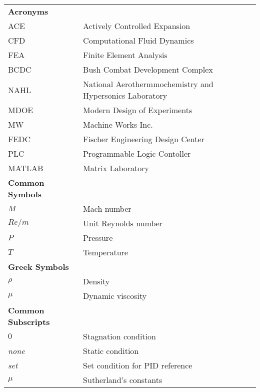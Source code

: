 \begin{spacing}{1.0}
    \begin{longtable}[htbp]{@{}p{} p{}@{}}
       
        \textbf{Acronyms}\\ [2ex] 
		ACE	& Actively Controlled Expansion\\ [2ex] %
		CFD	& Computational Fluid Dynamics\\ [2ex] 
		FEA & Finite Element Analysis\\	[2ex]
		BCDC & Bush Combat Development Complex\\ [2ex]
		NAHL & National Aerothermmochemistry and Hypersonics Laboratory\\ [2ex]
        MDOE & Modern Design of Experiments\\ [2ex]
		MW & Machine Works Inc.\\ [2ex]
		FEDC & Fischer Engineering Design Center\\ [2ex]
        PLC & Programmable Logic Contoller\\ [2ex]
        MATLAB & Matrix Laboratory\\ [2ex] 

        \textbf{Common Symbols}\\ [2ex] 
        $M$ & Mach number\\ [2ex]
        $Re/m$ & Unit Reynolds number\\ [2ex]
        $P$ & Pressure\\ [2ex]
        $T$ & Temperature\\ [2ex]

        \textbf{Greek Symbols}\\ [2ex] 
        $\rho$ & Density\\ [2ex]
        $\mu$ & Dynamic viscosity\\ [2ex]

        \textbf{Common Subscripts}\\ [2ex] 
        $0$ & Stagnation condition\\ [2ex] 
        \textit{none} & Static condition\\ [2ex]
        \textit{set} & Set condition for PID reference\\ [2ex]
        $\mu$ & Sutherland's constants\\ [2ex]

	\end{longtable}
\end{spacing}

\pagebreak{}
